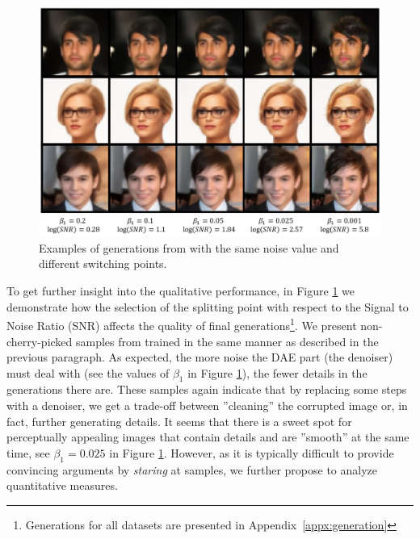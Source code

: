 \begin{figure}
    \begin{adjustbox}{center}
    \includegraphics[width=0.8\linewidth]{pics/4_daed/experiments/daed_generations.png}
    \end{adjustbox}
    \caption{Examples of generations from \ours{} with the same noise value and different switching points.}
    \label{fig:daed_generations} 
\vspace*{\baselineskip}
    \end{figure}

To get further insight into the qualitative performance, in Figure \ref{fig:daed_generations} we demonstrate how the selection of the splitting point with respect to the Signal to Noise Ratio (SNR) affects the quality of final generations\footnote{Generations for all datasets are presented in Appendix~\ref{appx:generation}}. We present non-cherry-picked samples from \ours{} trained in the same manner as described in the previous paragraph. As expected, the more noise the DAE part (the denoiser) must deal with (see the values of $\beta_1$ in Figure \ref{fig:daed_generations}), the fewer details in the generations there are. These samples again indicate that by replacing some steps with a denoiser, we get a trade-off between ''cleaning'' the corrupted image or, in fact, further generating details. It seems that there is a sweet spot for perceptually appealing images that contain details and are ''smooth'' at the same time, see $\beta_1=0.025$ in Figure \ref{fig:daed_generations}. However, as it is typically difficult to provide convincing arguments by \textit{staring} at samples, we further propose to analyze quantitative measures.

